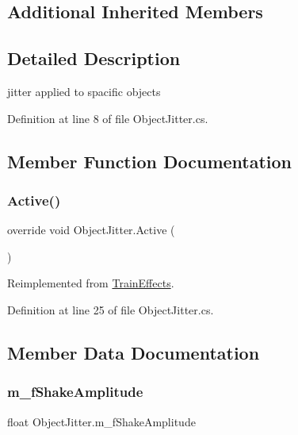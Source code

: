 \subsection*{Additional Inherited Members}


\subsection{Detailed Description}
jitter applied to spacific objects 



Definition at line 8 of file Object\+Jitter.\+cs.



\subsection{Member Function Documentation}
\mbox{\label{class_object_jitter_a77b8c9264b6894a2971d1b716590e159}} 
\subsubsection{\texorpdfstring{Active()}{Active()}}
{\footnotesize\ttfamily override void Object\+Jitter.\+Active (\begin{DoxyParamCaption}{ }\end{DoxyParamCaption})\hspace{0.3cm}{\ttfamily [virtual]}}



Reimplemented from \mbox{\hyperlink{class_train_effects_a444cb0c6444a8945f5e1a7f02dc83b99}{Train\+Effects}}.



Definition at line 25 of file Object\+Jitter.\+cs.



\subsection{Member Data Documentation}
\mbox{\label{class_object_jitter_aa0f708a987f78fc44b8db566765e459a}} 
\subsubsection{\texorpdfstring{m\+\_\+f\+Shake\+Amplitude}{m\_fShakeAmplitude}}
{\footnotesize\ttfamily float Object\+Jitter.\+m\+\_\+f\+Shake\+Amplitude}



